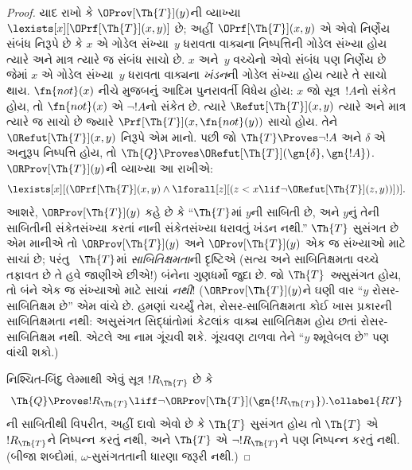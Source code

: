 \begin{proof}
યાદ રાખો કે
$\OProv[\Th{T}](y)$ની
વ્યાખ્યા
$\lexists[x][\OPrf[\Th{T}](x,
  y)]$ છે; અહીં
$\OPrf[\Th{T}](x, y)$
એ એવો નિર્ણેય સંબંધ
નિરૂપે છે કે $x$ એ
ગોડેલ સંખ્યા~$y$
ધરાવતા વાક્યના
નિષ્પત્તિની ગોડેલ
સંખ્યા હોય ત્યારે અને
માત્ર ત્યારે જ સંબંધ
સાચો છે. $x$ અને~$y$
વચ્ચેનો એવો સંબંધ પણ
નિર્ણેય છે જેમાં $x$ એ
ગોડેલ સંખ્યા~$y$ ધરાવતા
વાક્યના \emph{ખંડન}ની
ગોડેલ સંખ્યા હોય ત્યારે
તે સાચો થાય. $\fn{not}(x)$
નીચે મુજબનું આદિમ
પુનરાવર્તી વિધેય હોય:
$x$ જો સૂત્ર~$!A$નો
સંકેત હોય, તો
$\fn{not}(x)$ એ
$\lnot
!A$નો સંકેત છે.
ત્યારે $\Refut[\Th{T}](x, y)$
ત્યારે અને માત્ર ત્યારે જ
સાચો છે જ્યારે
$\Prf[\Th{T}](x, \fn{not}(y))$
સાચો હોય. તેને
$\ORefut[\Th{T}](x, y)$
નિરૂપે એમ માનો. પછી
જો $\Th{T} \Proves \lnot !A$
અને $\delta$ એ અનુરૂપ
નિષ્પત્તિ હોય, તો
$\Th{Q} \Proves
\ORefut[\Th{T}](\gn{\delta}, \gn{!A})$.
$\ORProv[\Th{T}](y)$ની
વ્યાખ્યા આ રાખીએ:
\[
\lexists[x][(\OPrf[\Th{T}](x,y) \land \lforall[z][(z < x \lif \lnot
  \ORefut[\Th{T}](z,y))])].
\]
આશરે, $\ORProv[\Th{T}](y)$
કહે છે કે ``$\Th{T}$માં
$y$ની સાબિતી છે, અને
$y$નું તેની સાબિતીની
સંકેતસંખ્યા કરતાં નાની
સંકેતસંખ્યા ધરાવતું
ખંડન નથી.''
$\Th{T}$ સુસંગત
છે એમ માનીએ તો
$\ORProv[\Th{T}](y)$ અને
$\OProv[\Th{T}](y)$
એક જ સંખ્યાઓ માટે
સાચાં છે; પરંતુ
~$\Th{T}$માં
\emph{સાબિતિક્ષમતા}ની
દૃષ્ટિએ (સત્ય અને
સાબિતિક્ષમતા વચ્ચે તફાવત
છે તે હવે જાણીએ છીએ!)
બંનેના ગુણધર્મો જુદા છે.
જો $\Th{T}$
\emph{અ}સુસંગત હોય,
તો બંને એક જ સંખ્યાઓ
માટે સાચાં \emph{નથી}!{}
($\ORProv[\Th{T}](y)$ને
ઘણી વાર ``$y$ રોસર-સાબિતિક્ષમ
છે'' એમ વાંચે છે.
હમણાં ચર્ચ્યું તેમ,
રોસર-સાબિતિક્ષમતા કોઈ
ખાસ પ્રકારની સાબિતિક્ષમતા
નથી: અસુસંગત સિદ્ધાંતોમાં
કેટલાંક વાક્ય
સાબિતિક્ષમ હોય છતાં
રોસર-સાબિતિક્ષમ નથી.
એટલે આ નામ ગૂંચવી શકે.
ગૂંચવણ ટાળવા તેને
``$y$ શ્મૂવેબલ છે'' પણ
વાંચી શકો.)

નિશ્ચિત-બિંદુ લેમ્માથી એવું
સૂત્ર $!R_\Th{T}$ છે કે
\begin{equation}
  \Th{Q} \Proves !R_\Th{T} \liff \lnot \ORProv[\Th{T}](\gn{!R_\Th{T}}).
  \ollabel{RT}
\end{equation}
ની
સાબિતીથી વિપરીત, અહીં
દાવો એવો છે કે
$\Th{T}$ સુસંગત હોય તો
$\Th{T}$ એ $!R_\Th{T}$ને
નિષ્પન્ન કરતું નથી,
અને $\Th{T}$ એ
$\lnot !R_\Th{T}$ને પણ
નિષ્પન્ન કરતું નથી.
(બીજા શબ્દોમાં,
$\omega$-સુસંગતતાની
ધારણા જરૂરી નથી.)


\end{proof}
